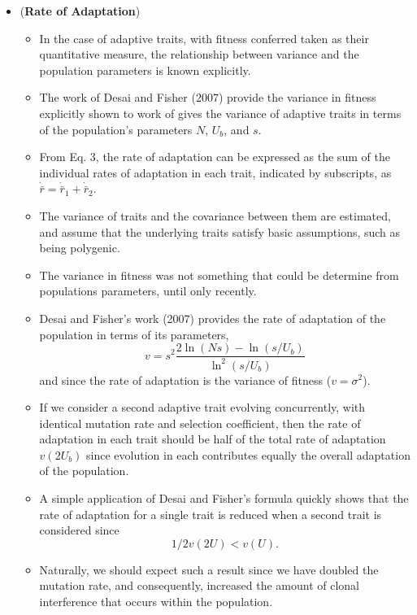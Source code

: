 \documentclass[11pt,one column]{article}
\begin{document}
\begin{itemize}
\item (\textbf{Rate of Adaptation})
\begin{itemize}
\item In the case of adaptive traits, with fitness conferred taken as their quantitative measure, the relationship between variance and the population parameters is known explicitly. 
\item The work of Desai and Fisher (2007) provide the variance in fitness explicitly shown to work of gives the variance of adaptive traits in terms of the population’s parameters $N$, $U_b$, and $s$. 
\item From Eq. 3, the rate of adaptation can be expressed as the sum of the individual rates of adaptation in each trait, indicated by subscripts, as $\dot{\bar{r}}=\dot{\bar{r}}_1 +\dot{\bar{r}}_2$.
\item The variance of traits and the covariance between them are estimated, and assume that the underlying traits satisfy basic assumptions, such as being polygenic. 
\item The variance in fitness was not something that could be determine from populations parameters, until only recently. 
\item Desai and Fisher’s work (2007) provides the rate of adaptation of the population in terms of its parameters, \[v =s^2  \frac{2 \ln(Ns)-\ln(s/U_b)}{\ln^2(s/U_b)}\] and since the rate of adaptation is the variance of fitness ($v=\sigma^2$).
\item If we consider a second adaptive trait evolving concurrently, with identical mutation rate and selection coefficient, then the rate of adaptation in each trait should be half of the total rate of adaptation $v(2U_b)$ since evolution in each contributes equally the overall adaptation of the population. 
\item A simple application of Desai and Fisher’s formula quickly shows that the rate of adaptation for a single trait is reduced when a second trait is considered since \[ 1/2  v(2U)<v(U). \]
\item Naturally, we should expect such a result since we have doubled the mutation rate, and consequently, increased the amount of clonal interference that occurs within the population. 
\end{itemize}


\end{itemize}
\end{document}
